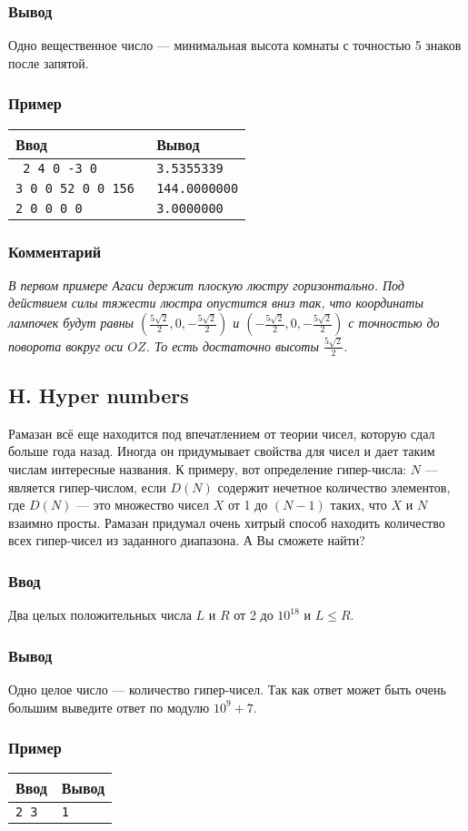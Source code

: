 \documentclass[10pt, a4paper]{article}
\newcommand{\informat}[1]
{
	\subsubsection*{Ввод} #1
}
\newcommand{\outformat}[1]
{
	\subsubsection*{Вывод} #1
}
\newcommand{\example}[2]
{
	\subsubsection*{Пример}
	\noindent
	\begin{center}
	\begin{tabularx}{\linewidth}{|X|X|}
	\hline
	Ввод & Вывод \\
	\hline
	{\tt #1} & {\tt #2}		\\
	\hline
	\end{tabularx}
	\end{center}
}
\newcommand{\exampleee}[6]
{
	\subsubsection*{Пример}
	\noindent
	\begin{center}
	\begin{tabularx}{\linewidth}{|X|X|}
	\hline
	Ввод 	& Вывод  	\\
	\hline
	{\tt #1} & {\tt #2}	\\
	\hline
	{\tt #3} & {\tt #4}	\\
	\hline
	{\tt #5} & {\tt #6}	\\
	\hline
	\end{tabularx}
	\end{center}
}
\newcommand{\excomm}[1]
{
	\subsubsection*{Комментарий}
	\textit{#1}
}
\begin{document}
\outformat{Одно вещественное число --- минимальная высота комнаты с точностью 5 знаков после запятой.}

\exampleee{
2 \newline
3 4 0 \newline
4 -3 0
}
{3.5355339}
{3 \newline
39 0 0 \newline
0 52 0 \newline
0 0 156
}
{144.0000000}
{2 \newline
1 0 0 \newline
-2 0 0
}
{3.0000000}

\excomm{В первом примере Агаси держит плоскую люстру горизонтально. Под действием силы тяжести люстра опустится вниз так, что координаты лампочек будут равны $\left(\frac{5 \sqrt{2}}{2}, 0, -\frac{5 \sqrt{2}}{2} \right)$ и $\left(-\frac{5 \sqrt{2}}{2}, 0, -\frac{5 \sqrt{2}}{2} \right)$ с точностью до поворота вокруг оси $OZ$. То есть достаточно высоты $\frac{5 \sqrt{2}}{2}$.}






\subsection*{H. Hyper numbers}
 

Рамазан всё еще находится под впечатлением от теории чисел, которую сдал больше года назад. Иногда он придумывает свойства для чисел и дает таким числам интересные названия. К примеру, вот определение гипер-числа: $N$ --- является гипер-числом, если $D(N)$ содержит нечетное количество элементов, где $D(N)$ --- это множество чисел $X$ от 1 до $(N-1)$ таких, что $X$ и $N$ взаимно просты. Рамазан придумал очень хитрый способ находить количество всех гипер-чисел из заданного диапазона. А Вы сможете найти?

\informat{Два целых положительных числа $L$ и $R$ от 2 до $10^{18}$ и $L \leqslant R$.}

\outformat{Одно целое число --- количество гипер-чисел. Так как ответ может быть очень большим выведите ответ по модулю $10^9+7$.}

\example{2 3}{1}
\end{document}
